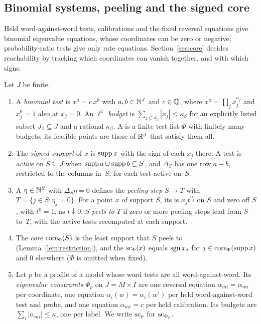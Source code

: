 \subsection{Binomial systems, peeling and the signed core}\label{sec:binomial}

Held word-against-word tests, calibrations and the fixed reversal equations
give binomial eigenvalue equations, whose coordinates can be zero or
negative; probability-ratio tests give only rate equations.
Section~\ref{sec:core} decides reachability by tracking which coordinates
can vanish together, and with which signs.

\begin{definition}\label{def:system}
Let $J$ be finite.
\begin{enumerate}
\item[(a)] A \emph{binomial test} is $x^a=c\,x^b$ with $a,b\in\mathbb{N}^J$ and
$c\in\mathbb{Q}$, where $x^a=\prod_jx_j^{a_j}$ and $x_j^0=1$ also at $x_j=0$. An
\emph{$\ell^1$ budget} is $\sum_{j\in J_\beta}|x_j|\le\kappa_\beta$ for an
explicitly listed subset $J_\beta\subseteq J$ and a rational $\kappa_\beta$.
A  is a finite test list $\Phi$
with finitely many budgets; its feasible points are those of $\mathbb{R}^J$ that
satisfy them all.
\item[(b)] The \emph{signed support} of $x$ is $\operatorname{supp} x$ with the sign of each
$x_j$ there. A test is \emph{active} on $S\subseteq J$ when
$\operatorname{supp} a\cup\operatorname{supp} b\subseteq S$, and $\Delta_S$ has one row $a-b$,
restricted to the columns in~$S$, for each test active on~$S$.
\item[(c)] A  $\eta\in\mathbb{N}^S$ with $\Delta_S\eta=0$ defines
the \emph{peeling step} $S\to T$ with $T=\{j\in S:\eta_j=0\}$. For a point
$x$ of support $S$, its  is $x_jt^{\eta_j}$ on $S$
and zero off $S$, with $t^0=1$, as $t\downarrow0$. $S$ \emph{peels to} $T$
if zero or more peeling steps lead from $S$ to~$T$, with the active tests
recomputed at each support.
\item[(d)] The \emph{core} $\operatorname{core}_\Phi(S)$ is the least support that $S$ peels to
(Lemma~\ref{lem:restriction}), and the 
$\operatorname{sc}_\Phi(x)$ equals $\operatorname{sgn} x_j$ for $j\in\operatorname{core}_\Phi(\operatorname{supp} x)$ and $0$
elsewhere ($\Phi$ is omitted when fixed).
\item[(e)] Let $p$ be a profile of a model whose word tests are all
word-against-word. Its \emph{eigenvalue constraints} $\Phi_p$ on
$J=M\times I$ are one reversal equation $\alpha_{\bar mi}=\alpha_{mi}$ per
coordinate, one equation $\alpha_i(w)=\alpha_i(w')$ per held
word-against-word test and probe, and one equation $\alpha_{mi}=c$ per held
calibration. Its budgets are $\sum_i|\alpha_{mi}|\le\kappa$, one per label.
We write $\operatorname{sc}_p$ for $\operatorname{sc}_{\Phi_p}$.
\end{enumerate}
\end{definition}

